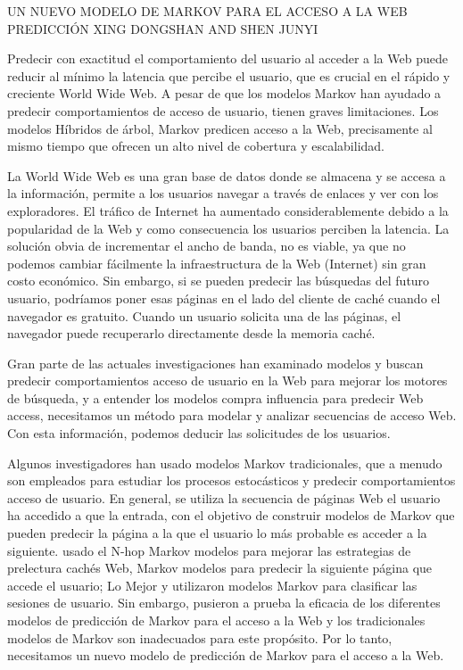 UN NUEVO MODELO DE MARKOV PARA EL ACCESO A LA WEB PREDICCIÓN
XING DONGSHAN AND SHEN JUNYI

Predecir con exactitud el comportamiento del usuario al acceder a la Web puede reducir al mínimo la latencia que percibe el usuario, que es crucial en el rápido y creciente World Wide Web. A pesar de que los modelos Markov han ayudado a predecir comportamientos de acceso de usuario, tienen graves limitaciones. Los modelos Híbridos de árbol, Markov predicen acceso a la Web, precisamente al mismo tiempo que ofrecen un alto nivel de cobertura y escalabilidad.

La World Wide Web es una gran base de datos donde se almacena  y se accesa a la información, permite a los usuarios navegar a través de enlaces y ver con los exploradores. El tráfico de Internet ha aumentado considerablemente debido a la popularidad de la Web y como consecuencia los usuarios perciben la latencia. La solución obvia de incrementar el ancho de banda, no es viable, ya que no podemos cambiar fácilmente la infraestructura de la Web (Internet) sin gran costo económico. Sin embargo, si se pueden predecir las búsquedas del futuro usuario, podríamos poner esas páginas en el lado del cliente de caché cuando el navegador es gratuito. Cuando un usuario solicita una de las páginas, el navegador puede recuperarlo directamente desde la memoria caché.

Gran parte de las actuales investigaciones han examinado modelos y buscan predecir comportamientos acceso de usuario en la Web para mejorar los motores de búsqueda, y a entender los modelos compra influencia para predecir Web access, necesitamos un método para modelar y analizar secuencias de acceso Web. Con esta información, podemos deducir las solicitudes de los usuarios.

Algunos investigadores han usado modelos Markov tradicionales, que a menudo son empleados para estudiar los procesos estocásticos y predecir comportamientos acceso de usuario. En general, se utiliza la secuencia de páginas Web el usuario ha accedido a que la entrada, con el objetivo de construir modelos de Markov que pueden predecir la página a la que el usuario lo más probable es acceder a la siguiente.  usado el N-hop Markov modelos para mejorar las estrategias de prelectura cachés Web,  Markov modelos para predecir la siguiente página que accede el usuario;  Lo Mejor y  utilizaron modelos Markov para clasificar las sesiones de usuario.  Sin embargo, pusieron a prueba la eficacia de los diferentes modelos de predicción de Markov para el acceso a la Web y los tradicionales modelos de Markov son inadecuados para este propósito. Por lo tanto, necesitamos un nuevo modelo de predicción de Markov para el acceso a la Web.

